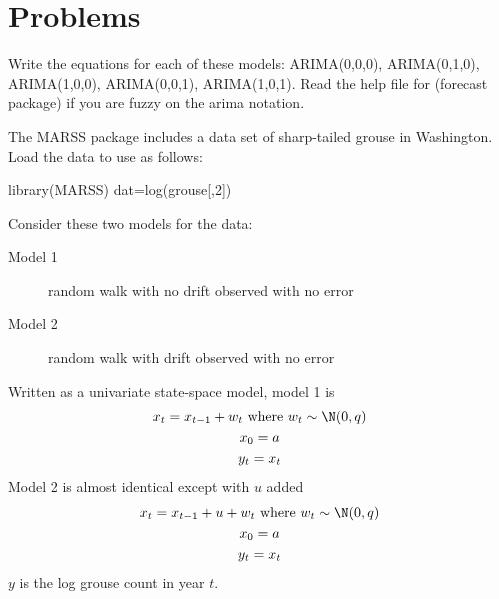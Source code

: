 \clearpage
\renewcommand{\rightmark}{}
\section*{Problems}
\begin{hwenumerate}

\item\label{hw-arima-defs} Write the equations for each of these models: ARIMA(0,0,0), ARIMA(0,1,0), ARIMA(1,0,0), ARIMA(0,0,1), ARIMA(1,0,1).  Read the help file for \verb@Arima@ (forecast package) if you are fuzzy on the arima notation.

\item\label{hw-uniss-1} The MARSS package includes a data set of sharp-tailed grouse in Washington.  Load the data to use as follows:

\begin{Schunk}
\begin{Sinput}
 library(MARSS)
 dat=log(grouse[,2])
\end{Sinput}
\end{Schunk}

Consider these two models for the data:

\begin{description}
\item[Model 1] random walk with no drift observed with no error
\item[Model 2] random walk with drift observed with no error
\end{description}

Written as a univariate state-space model, model 1 is
\begin{equation}
\begin{gathered}
x_t = x_{t-1}+w_t \text{ where } w_t \sim \N(0,q)\\
x_0 = a \\
y_t = x_t 
\end{gathered}   
\label{eq:hw2.1}
\end{equation}
Model 2 is almost identical except with $u$ added
\begin{equation}
\begin{gathered}
x_t = x_{t-1}+u+w_t \text{ where } w_t \sim \N(0,q)\\
x_0 = a \\
y_t = x_t 
\end{gathered}   
\label{eq:hw2.2}
\end{equation}
$y$ is the log grouse count in year $t$. 


\end{hwenumerate}

